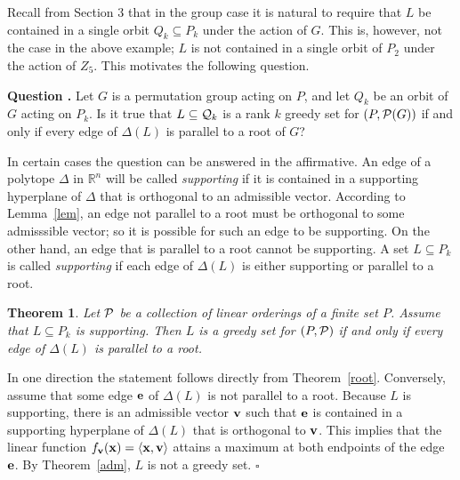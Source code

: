\documentclass[12pt]{article}
\newcommand{\R}{{\mathbb R}}
\newcommand{\Q}{{\cal Q}}
\renewcommand{\P}{{\cal P}}
\newcommand{\proof}{\noindent{\em Proof: }}
\newcommand{\m}{\medskip}
\newcommand{\B}{\bigskip}
\newcommand{\qed}{\hspace{\fill}$\square$}
\renewcommand{\theequation}{\thesection.\arabic{equation}}
\newtheorem{theorem}[equation]{Theorem}
\newenvironment{question}{\noindent\refstepcounter{equation}
{\bf Question \theequation}}{\m}
\begin{document}
Recall from Section 3 that in the group case it is
natural to require that $L$ be contained in a single orbit $Q_k \subseteq
P_k$ under the action of $G$.  This is, however, not the case in the
above example; $L$ is not contained in a single orbit of $P_2$ under
the action of $Z_5$.  This motivates the following question.
\B

\begin{question} \label{ques} Let $G$ is a permutation group acting
on $P$, and let $Q_k$ be an orbit of $G$ acting on $P_k$.
Is it true that $L \subseteq \Q_k$ is a rank $k$ greedy set for $(P,
\P(G))$ if and only if every edge of $\Delta (L)$ is parallel to a
root of $G$?
\end{question}
\B

In certain cases the question can be answered in the affirmative.  An
edge of a polytope $\Delta$ in $\R^n$ will be called {\it supporting}
if it is contained in a supporting hyperplane of $\Delta$ that is
orthogonal to an admissible vector.  According to Lemma~\ref{lem}, an
edge not parallel to a root must be orthogonal to some admisssible
vector; so it is possible for such an edge to be supporting.  On the
other hand, an edge that is parallel to a root cannot be supporting.
A set $L \subseteq P_k$  is called {\it supporting} if each edge
of $\Delta(L)$ is either supporting or parallel to a root.

\begin{theorem}  Let $\P$ be a collection of linear orderings
of a finite set $P$.  Assume that $L \subseteq P_k$ is supporting.
Then $L$ is a greedy set for $(P,\P)$ if and only if every edge of
$\Delta (L)$ is parallel to a root.
\end{theorem}

\proof In one direction the statement follows directly from
Theorem~\ref{root}.  Conversely, assume that some edge ${\bf e}$ of
$\Delta (L)$ is not parallel to a root.  Because $L$ is
supporting, there is an admissible vector ${\bf v}$ such that
${\bf e}$ is contained in a supporting hyperplane of $\Delta (L)$ that is
orthogonal to ${\bf v}$.  This implies that the linear function
$f_{\bf v}({\bf x}) = \langle {\bf x}, {\bf v} \rangle$ attains a
maximum at both endpoints of the edge ${\bf e}$.  By Theorem~\ref{adm},
$L$ is not a greedy set.  \qed \B
\end{document}
